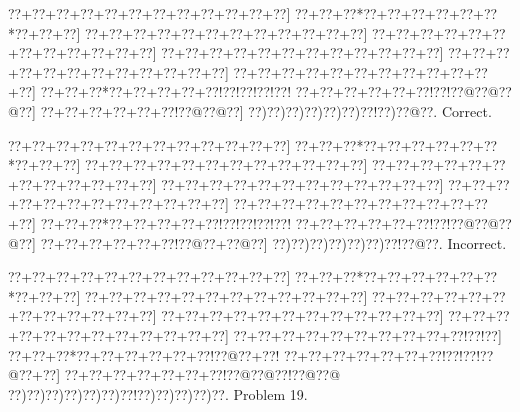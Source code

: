 \documentclass[a5paper]{article}
\begin{document}
\begin{center}
{\goo
\0??+\0??+\0??+\0??+\0??+\0??+\0??+\0??+\0??+\0??+\0??+\0??]
\0??+\0??+\0??*\0??+\0??+\0??+\0??+\0??+\0??*\0??+\0??+\0??]
\0??+\0??+\0??+\0??+\0??+\0??+\0??+\0??+\0??+\0??+\0??+\0??]
\0??+\0??+\0??+\0??+\0??+\0??+\0??+\0??+\0??+\0??+\0??+\0??]
\0??+\0??+\0??+\0??+\0??+\0??+\0??+\0??+\0??+\0??+\0??+\0??]
\0??+\0??+\0??+\0??+\0??+\0??+\0??+\0??+\0??+\0??+\0??+\0??]
\0??+\0??+\0??+\0??+\0??+\0??+\0??+\0??+\0??+\0??+\0??+\0??]
\0??+\0??+\0??*\0??+\0??+\0??+\0??+\0??!\0??!\0??!\0??!\0??!
\0??+\0??+\0??+\0??+\0??+\0??!\0??!\0??@\0??@\0??@\0??]
\0??+\0??+\0??+\0??+\0??+\0??!\0??@\0??@\0??]
\0??)\0??)\0??)\0??)\0??)\0??)\0??!\0??)\0??@\0??.
}
Correct. 

\end{center}
\begin{center}
{\goo
\0??+\0??+\0??+\0??+\0??+\0??+\0??+\0??+\0??+\0??+\0??+\0??]
\0??+\0??+\0??*\0??+\0??+\0??+\0??+\0??+\0??*\0??+\0??+\0??]
\0??+\0??+\0??+\0??+\0??+\0??+\0??+\0??+\0??+\0??+\0??+\0??]
\0??+\0??+\0??+\0??+\0??+\0??+\0??+\0??+\0??+\0??+\0??+\0??]
\0??+\0??+\0??+\0??+\0??+\0??+\0??+\0??+\0??+\0??+\0??+\0??]
\0??+\0??+\0??+\0??+\0??+\0??+\0??+\0??+\0??+\0??+\0??+\0??]
\0??+\0??+\0??+\0??+\0??+\0??+\0??+\0??+\0??+\0??+\0??+\0??]
\0??+\0??+\0??*\0??+\0??+\0??+\0??+\0??!\0??!\0??!\0??!\0??!
\0??+\0??+\0??+\0??+\0??+\0??!\0??!\0??@\0??@\0??@\0??]
\0??+\0??+\0??+\0??+\0??+\0??!\0??@\0??+\0??@\0??]
\0??)\0??)\0??)\0??)\0??)\0??)\0??!\0??@\0??.
}
Incorrect. 

\end{center}
\newpage
\begin{center}
{\goo
\0??+\0??+\0??+\0??+\0??+\0??+\0??+\0??+\0??+\0??+\0??+\0??]
\0??+\0??+\0??*\0??+\0??+\0??+\0??+\0??+\0??*\0??+\0??+\0??]
\0??+\0??+\0??+\0??+\0??+\0??+\0??+\0??+\0??+\0??+\0??+\0??]
\0??+\0??+\0??+\0??+\0??+\0??+\0??+\0??+\0??+\0??+\0??+\0??]
\0??+\0??+\0??+\0??+\0??+\0??+\0??+\0??+\0??+\0??+\0??+\0??]
\0??+\0??+\0??+\0??+\0??+\0??+\0??+\0??+\0??+\0??+\0??+\0??]
\0??+\0??+\0??+\0??+\0??+\0??+\0??+\0??+\0??+\0??!\0??!\0??]
\0??+\0??+\0??*\0??+\0??+\0??+\0??+\0??+\0??!\0??@\0??+\0??!
\0??+\0??+\0??+\0??+\0??+\0??+\0??!\0??!\0??!\0??@\0??+\0??]
\0??+\0??+\0??+\0??+\0??+\0??+\0??!\0??@\0??@\0??!\0??@\0??@
\0??)\0??)\0??)\0??)\0??)\0??)\0??!\0??)\0??)\0??)\0??)\0??.
}
Problem 19.

\end{center}
\end{document}
